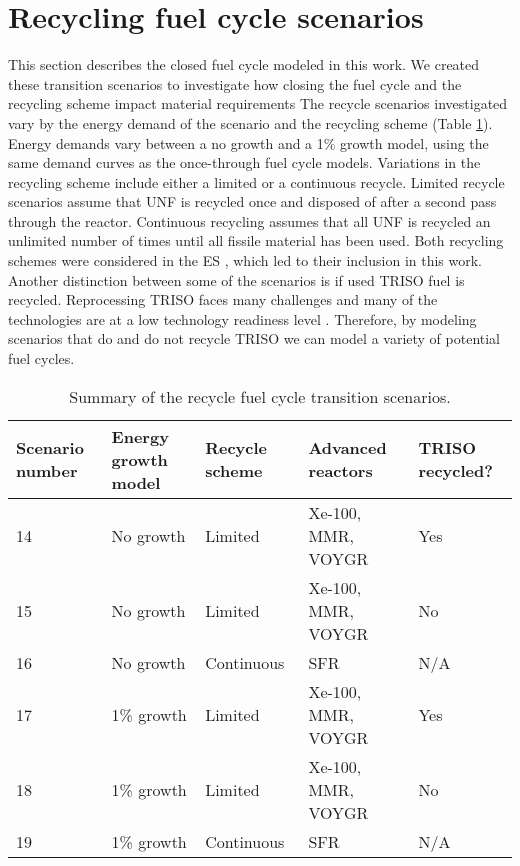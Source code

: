 \section{Recycling fuel cycle scenarios}\label{sec:recycle-methods}
This section describes the closed fuel cycle modeled in this work. 
We created these transition scenarios to investigate how closing 
the fuel cycle and the recycling scheme impact material 
requirements The recycle scenarios investigated  
vary by the energy demand of the scenario and the recycling 
scheme (Table \ref{tab:scenarios_recycle}). Energy demands vary 
between a no growth and a 1\% growth model, using the same 
demand curves as the once-through 
fuel cycle models. Variations in the recycling 
scheme include either a limited or a continuous recycle. Limited recycle 
scenarios assume that \gls{UNF} is recycled once and disposed of after a 
second pass through the reactor. Continuous recycling assumes that all 
\gls{UNF} is recycled an unlimited number of times until all fissile 
material has been used. Both recycling schemes were considered in the 
\acrfull{ES} \cite{wigeland_nuclear_2014}, which led to their inclusion 
in this work. Another distinction between some of the 
scenarios is if used \gls{TRISO} fuel is recycled. Reprocessing \gls{TRISO}
faces many challenges and many of the technologies are at a low technology 
readiness level \cite{arm_plan_2022,kiegiel_management_2022}.
Therefore, by modeling scenarios that do and do not recycle 
\gls{TRISO} we can model a variety of potential fuel cycles. 

\begin{table}[ht]
    \centering
    \caption{Summary of the recycle fuel cycle transition scenarios.}
    \label{tab:scenarios_recycle}
    \begin{tabular}{l l l l l}
            \hline
            Scenario number & Energy growth model & Recycle scheme &
            Advanced reactors & \gls{TRISO} recycled?\\
            \hline
            14 & No growth & Limited & Xe-100, MMR, VOYGR & Yes\\
            15 & No growth & Limited & Xe-100, MMR, VOYGR & No\\
            16 & No growth & Continuous & SFR & N/A \\
            17 & 1\% growth & Limited & Xe-100, MMR, VOYGR & Yes\\
            18 & 1\% growth & Limited & Xe-100, MMR, VOYGR & No\\
            19 & 1\% growth & Continuous & SFR & N/A \\
            \hline
    \end{tabular}
\end{table}

